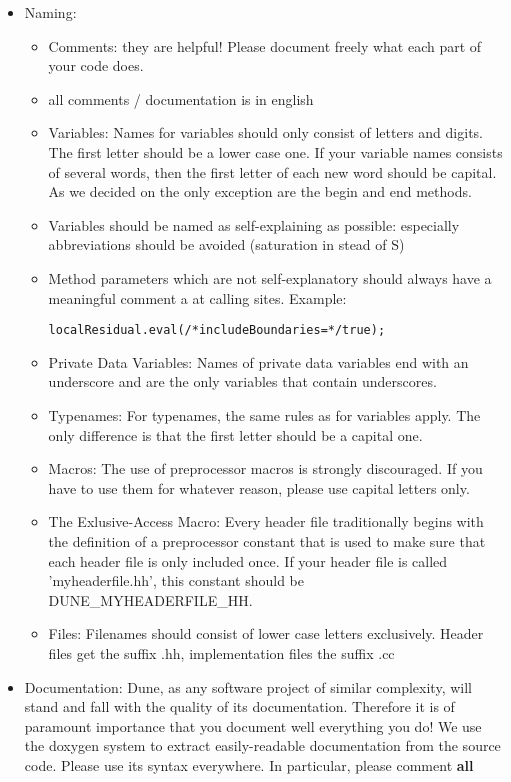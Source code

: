 \begin{itemize}
\item Naming: 
\begin{itemize}
\item Comments: they are helpful! Please document freely what each part of your code does. 
\item all comments / documentation is in english
\item Variables: Names for variables should only consist of letters and digits. The first letter should be a lower case one. If your variable names consists of several words, then the first letter of each new word should be capital. As we decided on the only exception are the begin and end methods.
\item Variables should be named as self-explaining as possible: especially abbreviations should be avoided (saturation in stead of S)
\item Method parameters which are not self-explanatory should always
  have a meaningful comment a at calling sites. Example:
\begin{lstlisting}[basicstyle=\ttfamily\scriptsize]
   localResidual.eval(/*includeBoundaries=*/true);
\end{lstlisting}
\item Private Data Variables: Names of private data variables end with an underscore and are the only variables that contain underscores. 
\item Typenames: For typenames, the same rules as for variables apply. The only difference is that the first letter should be a capital one.
\item Macros: The use of preprocessor macros is strongly discouraged. If you have to use them for whatever reason, please use capital letters only.
\item The Exlusive-Access Macro: Every header file traditionally begins with the definition of a preprocessor constant that is used to make sure that each header file is only included once. If your header file is called 'myheaderfile.hh', this constant should be DUNE\_MYHEADERFILE\_HH.
\item Files: Filenames should consist of lower case letters exclusively. Header files get the suffix .hh, implementation files the suffix .cc
\end{itemize}
\item Documentation:
      Dune, as any software project of similar complexity, will stand and fall with the quality of its documentation.
Therefore it is of paramount importance that you document well everything you do! We use the doxygen system to extract easily-readable documentation from the source code. Please use its syntax everywhere. In particular, please comment \textbf{all}

\end{itemize}
